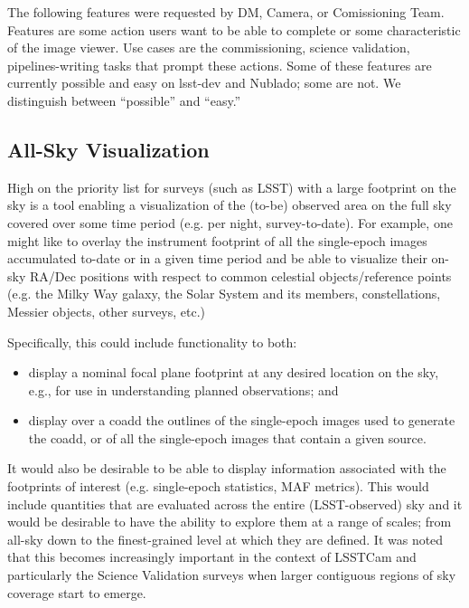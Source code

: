 
The following features were requested by DM, Camera, or Comissioning Team.
Features are some action users want to be able to complete or some characteristic of the image viewer.
Use cases are the commissioning,  science validation, pipelines-writing tasks that prompt these actions.
Some of these features are currently possible and easy on lsst-dev and Nublado; some are not.
We distinguish between ``possible'' and ``easy.''

\subsection{All-Sky Visualization}

High on the priority list for surveys (such as LSST) with a large footprint on the sky is a tool enabling a visualization of the (to-be) observed area on the full sky covered over some time period (e.g. per night, survey-to-date). For example, one might like to overlay the instrument footprint of all the single-epoch images accumulated to-date or in a given time period and be able to visualize their on-sky RA/Dec positions with respect to common celestial objects/reference points (e.g. the Milky Way galaxy, the Solar System and its members, constellations, Messier objects, other surveys, etc.)

Specifically, this could include functionality to both:
\begin{itemize}
  \item{display a nominal focal plane footprint at any desired location on the sky, e.g., for use in understanding planned observations; and}
  \item{display over a coadd the outlines of the single-epoch images used to generate the coadd, or of all the single-epoch images that contain a given source.}
\end{itemize}

It would also be desirable to be able to display information associated with the footprints of interest (e.g. single-epoch statistics, MAF metrics).  This would include quantities that are evaluated across the entire (LSST-observed) sky and it would be desirable to have the ability to explore them at a range of scales; from all-sky down to the finest-grained level at which they are defined.  It was noted that this becomes increasingly important in the context of LSSTCam and particularly the Science Validation surveys when larger contiguous regions of sky coverage start to emerge.

